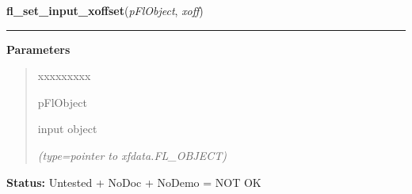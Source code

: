     \label{xformslib:flinput:fl_set_input_xoffset}

    \vspace{0.5ex}

\hspace{.8\funcindent}\begin{boxedminipage}{\funcwidth}

    \raggedright \textbf{fl\_set\_input\_xoffset}(\textit{pFlObject}, \textit{xoff})

    \vspace{-1.5ex}

    \rule{\textwidth}{0.5\fboxrule}
\setlength{\parskip}{2ex}
\setlength{\parskip}{1ex}
      \textbf{Parameters}
      \vspace{-1ex}

      \begin{quote}
        \begin{Ventry}{xxxxxxxxx}

          \item[pFlObject]

          input object

            {\it (type=pointer to xfdata.FL\_OBJECT)}

        \end{Ventry}

      \end{quote}

\textbf{Status:} Untested + NoDoc + NoDemo = NOT OK



    \end{boxedminipage}

    \label{xformslib:flinput:fl_get_input_xoffset}

    \vspace{0.5ex}

